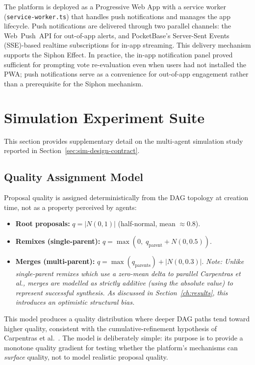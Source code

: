 \documentclass[a4paper, 12pt, twoside]{iviathesis}
\begin{document}
The platform is deployed as a Progressive Web App with a service worker (\texttt{service-\allowbreak worker.ts}) that handles push notifications and manages the app lifecycle. Push notifications are delivered through two parallel channels: the Web~Push~API for out-of-app alerts, and PocketBase's Server-Sent Events (SSE)-based realtime subscriptions for in-app streaming. This delivery mechanism supports the Siphon Effect. In practice, the in-app notification panel proved sufficient for prompting vote re-evaluation even when users had not installed the PWA; push notifications serve as a convenience for out-of-app engagement rather than a prerequisite for the Siphon mechanism.

\section{Simulation Experiment Suite}
\label{sec:sim-appendix}

This section provides supplementary detail on the multi-agent simulation study reported in Section~\ref{sec:sim-design-contract}.

\subsection{Quality Assignment Model}

Proposal quality is assigned deterministically from the DAG topology at creation time, not as a property perceived by agents:
\begin{itemize}
    \item \textbf{Root proposals:} $q = |N(0, 1)|$ (half-normal, mean $\approx 0.8$).
    \item \textbf{Remixes (single-parent):} $q = \max(0,\; q_{\text{parent}} + N(0, 0.5))$.
    \item \textbf{Merges (multi-parent):} $q = \max(q_{\text{parents}}) + |N(0, 0.3)|$. \textit{Note: Unlike single-parent remixes which use a zero-mean delta to parallel Carpentras et al., merges are modelled as strictly additive (using the absolute value) to represent successful synthesis. As discussed in Section~\ref{ch:results}, this introduces an optimistic structural bias.}
\end{itemize}

\noindent This model produces a quality distribution where deeper DAG paths tend toward higher quality, consistent with the cumulative-refinement hypothesis of Carpentras et al.\ \cite{carpentras_wisdom_2025}. The model is deliberately simple: its purpose is to provide a monotone quality gradient for testing whether the platform's mechanisms can \textit{surface} quality, not to model realistic proposal quality.
\end{document}
